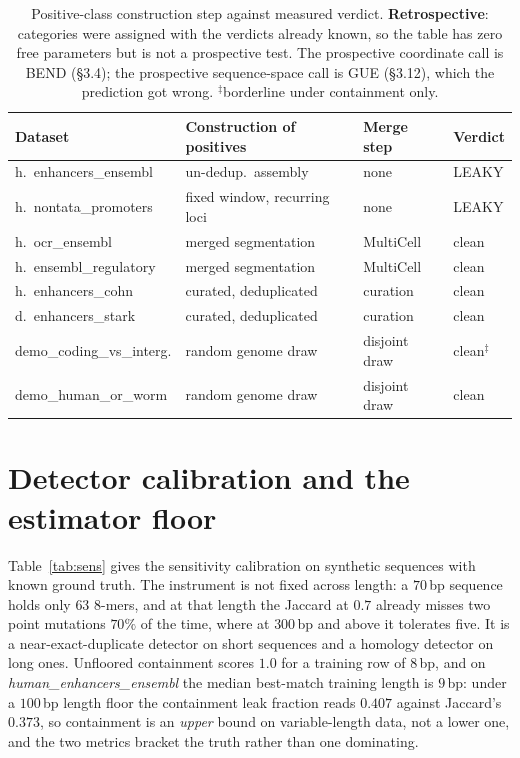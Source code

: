 \documentclass[11pt,a4paper]{article}
\providecommand{\botrule}{\bottomrule}
\begin{document}
\begin{table}[htbp]
\begin{center}
\caption{Positive-class construction step against measured verdict. \textbf{Retrospective}: categories were assigned with the verdicts already known, so the table has zero free parameters but is not a prospective test. The prospective coordinate call is BEND (\S3.4); the prospective sequence-space call is GUE (\S3.12), which the prediction got wrong. $^{\ddagger}$borderline under containment only.\label{tab:provenance}}
\footnotesize\setlength{\tabcolsep}{3pt}\begin{tabular}{@{}llll@{}}
\toprule
Dataset & Construction of positives & Merge step & Verdict\\
\midrule
h.\ enhancers\_ensembl & un-dedup.\ assembly & none & LEAKY\\
h.\ nontata\_promoters & fixed window, recurring loci & none & LEAKY\\
h.\ ocr\_ensembl & merged segmentation & MultiCell & clean\\
h.\ ensembl\_regulatory & merged segmentation & MultiCell & clean\\
h.\ enhancers\_cohn & curated, deduplicated & curation & clean\\
d.\ enhancers\_stark & curated, deduplicated & curation & clean\\
demo\_coding\_vs\_interg. & random genome draw & disjoint draw & clean$^{\ddagger}$\\
demo\_human\_or\_worm & random genome draw & disjoint draw & clean\\
\botrule
\end{tabular}
\end{center}
\end{table}

\section{Detector calibration and the estimator floor}\label{sec:s-detector}
Table~\ref{tab:sens} gives the sensitivity calibration on synthetic sequences with known ground
truth. The instrument is not fixed across length: a $70$\,bp sequence holds only $63$ $8$-mers, and
at that length the Jaccard at $0.7$ already misses two point mutations $70\%$ of the time, where at
$300$\,bp and above it tolerates five. It is a near-exact-duplicate detector on short sequences and a
homology detector on long ones. Unfloored containment scores $1.0$ for a training row of $8$\,bp,
and on \textit{human\_enhancers\_ensembl} the median best-match training length is $9$\,bp: under a
$100$\,bp length floor the containment leak fraction reads $0.407$ against Jaccard's $0.373$, so
containment is an \emph{upper} bound on variable-length data, not a lower one, and the two metrics
bracket the truth rather than one dominating.
\end{document}
